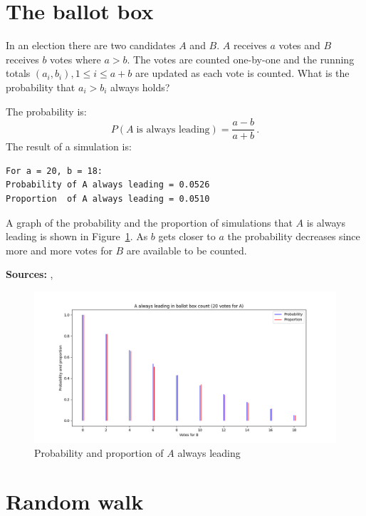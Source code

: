 \documentclass[11pt,a4paper]{article}
\newcommand*{\disfrac}[2]{\displaystyle\frac{#1}{#2}}
\begin{document}

\section{The ballot box}\label{s.ballot}

In an election there are two candidates $A$ and $B$.  $A$ receives $a$ votes and $B$ receives $b$ votes where $a>b$. The votes are counted one-by-one and the running totals $(a_i,b_i), 1\leq i \leq a+b$ are updated as each vote is counted. What is the probability that $a_i>b_i$ always holds?

The probability is:
\[
P(A \;\textrm{is always leading}) = \disfrac{a-b}{a+b}\,.
\]
The result of a simulation is:
\begin{verbatim}
For a = 20, b = 18:
Probability of A always leading = 0.0526
Proportion  of A always leading = 0.0510
\end{verbatim}
A graph of the probability and the proportion of simulations that $A$ is always leading is shown in Figure~\ref{f.ballot-01}. As $b$ gets closer to $a$ the probability decreases since more and more votes for $B$ are available to be counted.

\textbf{Sources:} \cite[Problem 22]{mosteller,mos}, \cite[Section 16.3]{border}

\begin{figure}
\begin{center}
\includegraphics[width=\textwidth]{ballot-01}
\caption{Probability and proportion of $A$ always leading}\label{f.ballot-01}
\end{center}
\end{figure}


\section{Random walk}\label{s.walk}
\end{document}
